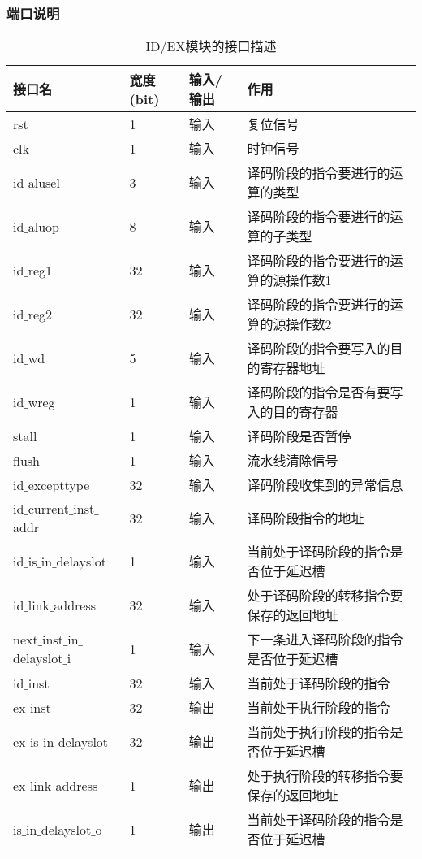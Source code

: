 \subsubsection{端口说明}
\begin{table}[H]
	\centering
	\caption{ID/EX模块的接口描述}
	\begin{tabular}{|l|l|l|l|}
		\hline
		接口名 & 宽度(bit) & 输入/输出 & 作用 \\
		\hline
		rst & 1 & 输入 & 复位信号 \\
		\hline
		clk & 1 & 输入 & 时钟信号 \\
		\hline
		id$\_$alusel & 3 & 输入 & 译码阶段的指令要进行的运算的类型 \\
		\hline
		id$\_$aluop & 8 & 输入 & 译码阶段的指令要进行的运算的子类型 \\
		\hline
		id$\_$reg1 & 32 & 输入 & 译码阶段的指令要进行的运算的源操作数1 \\
		\hline
		id$\_$reg2 & 32 & 输入 & 译码阶段的指令要进行的运算的源操作数2 \\
		\hline
		id$\_$wd & 5 & 输入 & 译码阶段的指令要写入的目的寄存器地址 \\
		\hline
		id$\_$wreg & 1 & 输入 & 译码阶段的指令是否有要写入的目的寄存器 \\
		\hline
		stall & 1 & 输入 & 译码阶段是否暂停 \\
		\hline
		flush & 1 & 输入 & 流水线清除信号 \\
		\hline
		id$\_$excepttype & 32 & 输入 & 译码阶段收集到的异常信息 \\
		\hline
		id$\_$current$\_$inst$\_$addr & 32 & 输入 & 译码阶段指令的地址 \\
		\hline
		id$\_$is$\_$in$\_$delayslot & 1 & 输入 & 当前处于译码阶段的指令是否位于延迟槽 \\
		\hline
		id$\_$link$\_$address & 32 & 输入 & 处于译码阶段的转移指令要保存的返回地址 \\
		\hline
		next$\_$inst$\_$in$\_$delayslot$\_$i & 1 & 输入 & 下一条进入译码阶段的指令是否位于延迟槽 \\
		\hline
		id$\_$inst & 32 & 输入 & 当前处于译码阶段的指令 \\
		\hline
		ex$\_$inst & 32 & 输出 & 当前处于执行阶段的指令 \\
		\hline
		ex$\_$is$\_$in$\_$delayslot & 32 & 输出 & 当前处于执行阶段的指令是否位于延迟槽 \\
		\hline
		ex$\_$link$\_$address & 1 & 输出 & 处于执行阶段的转移指令要保存的返回地址 \\
		\hline
		is$\_$in$\_$delayslot$\_$o & 1 & 输出 & 当前处于译码阶段的指令是否位于延迟槽 \\

\end{tabular}
\end{table}
